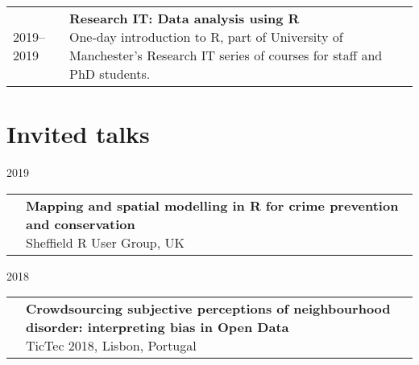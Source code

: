 \documentclass[10pt,a4paper,]{article}
\makeatletter
\def\briefitem#1#2#3{
#2 & \parbox[t]{0.85\textwidth}{%
      \textbf{#1}\\[-0.1cm]{\footnotesize #3}}\\[0.4cm]}
\def\briefsection#1{\begin{longtable}{@{\extracolsep{\fill}}ll}#1\end{longtable}}
\makeatother
\begin{document}
\briefsection{\briefitem{Research IT: Data analysis using R}{2019–2019}{One-day introduction to R, part of University of Manchester's Research IT series of courses for staff and PhD students.}\briefitem{methods@manchester: Getting Started in R: introduction to data analysis \& visualisation}{2017–present}{Weeklong intensive course introducing students to using R and R Studio for data analysis. Open to all, usually attended by professionals and academics.}\briefitem{Q-Step internship preparation: Introduction to mapping data with QGIS}{2017–present}{Afternoon short introduction to mapping spatial data for Q-step internship students}\briefitem{Stockholm Royal Institute of Technology (KTH): Spatial Data Analysis in Practice}{2017–2017}{One-day introduction to mapping with QGIS and data collection from APIs as part of weeklong summer school for PhD students}\briefitem{University College London MSc Transport Studies: Trasport Safety and Security}{2012–2017}{Guest lecture for graduate module, UCL Department of Civil, Environmental, and Geomatic Engineering}}

\hypertarget{invited-talks}{%
\section{Invited talks}\label{invited-talks}}

2019
\briefsection{\briefitem{Mapping and spatial modelling in R for crime prevention and conservation}{}{Sheffield R User Group, UK}\briefitem{The role of innovative data collection methods in advancing understanding, and the importance of considering the biases within}{}{Women in Data Science: Zurich, Switzerland}\briefitem{Keynote: Data-driven insights in law: opportunities and cautions}{}{Berlin Legal Tech Conference 2019, Germany}\briefitem{The role of innovative data collection methods in advancing behavioural understanding}{}{Cognitive and Decision Sciences, University of Basel, Switzerland}\briefitem{The role of innovative data collection methods in advancing criminological understanding}{}{Manchester Metropolitan University Big Data Centre Seminar Series, UK}}

2018
\briefsection{\briefitem{Crowdsourcing subjective perceptions of neighbourhood disorder: interpreting bias in Open Data}{}{TicTec 2018, Lisbon, Portugal}\briefitem{Interdisciplinary Alchemy: Data Science + Social Science}{}{Data Kind UK}\briefitem{Everybody Lies but Not Everybody Tweets: Making Sense of the Bias in Your Data}{}{Advances in Data Science conference, Manchester, UK}}
\end{document}
